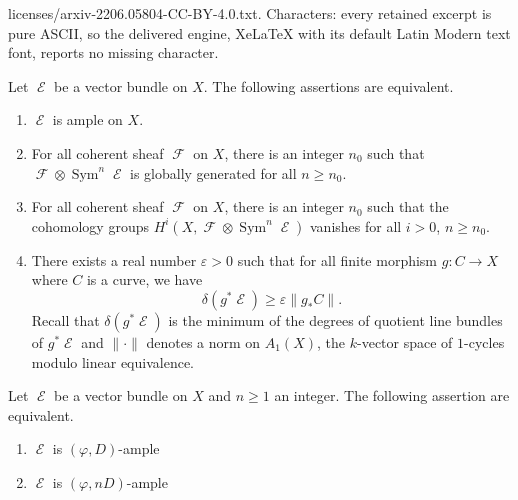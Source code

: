 \documentclass[10pt,a4paper]{amsart}
\DeclareMathOperator{\E}{\mathcal{E}}
\DeclareMathOperator{\Fc}{\mathcal{F}}
\DeclareMathOperator{\Sym}{Sym}
\begin{document}
licenses/arxiv-2206.05804-CC-BY-4.0.txt. Characters: every retained excerpt is pure ASCII, so the delivered engine, XeLaTeX with its default Latin Modern text font, reports no missing character.
\begin{proposition}\label{amp_criterion}
Let $\E$ be a vector bundle on $X$. The following assertions are equivalent.
\begin{enumerate}
\item $\E$ is ample on $X$.
\item For all coherent sheaf $\Fc$ on $X$, there is an integer $n_0$ such that $\Fc \otimes \Sym^{n}\E$ is globally generated for all $n \geq n_0$.
\item For all coherent sheaf $\Fc$ on $X$, there is an integer $n_0$ such that the cohomology groups $H^i(X,\Fc \otimes \Sym^{n}\E)$ vanishes for all $i>0$, $n \geq n_0$.
\item There exists a real number $\varepsilon > 0$ such that for all finite morphism $g : C \rightarrow X$ where $C$ is a curve, we have
\begin{equation*}
\delta(g^*\E) \geq \varepsilon \lVert g_*C \rVert.
\end{equation*}
Recall that $\delta(g^*\E)$ is the minimum of the degrees of quotient line bundles of $g^*\E$ and $\lVert \cdot \rVert$ denotes a norm on $A_1(X)$, the $k$-vector space of $1$-cycles modulo linear equivalence.
\end{enumerate}
\end{proposition}

\begin{proposition}\label{nD}
Let $\E$ be a vector bundle on $X$ and $n\geq 1$ an integer. The following assertion are equivalent.
\begin{enumerate}
\item $\E$ is $(\varphi,D)$-ample
\item $\E$ is $(\varphi,nD)$-ample
\end{enumerate}
\end{proposition}
\end{document}
